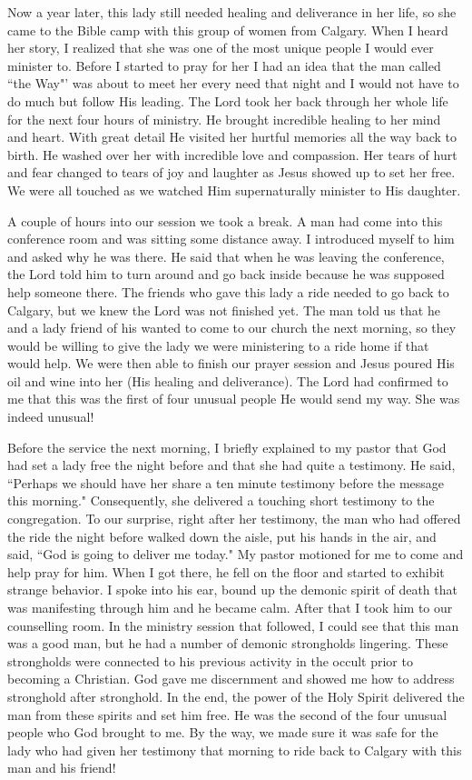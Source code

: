 \documentclass[oneside]{book}
\begin{document}
Now a year later, this lady still needed healing and deliverance in her life, so she came to the Bible camp with this group of women from Calgary. When I heard her story, I realized that she was one of the most unique people I would ever minister to. Before I started to pray for her I had an idea that the man called ``the Way"' was about to meet her every need that night and I would not have to do much but follow His leading. The Lord took her back through her whole life for the next four hours of ministry. He brought incredible healing to her mind and heart. With great detail He visited her hurtful memories all the way back to birth. He washed over her with incredible love and compassion. Her tears of hurt and fear changed to tears of joy and laughter as Jesus showed up to set her free. We were all touched as we watched Him supernaturally minister to His daughter.


A couple of hours into our session we took a break. A man had come into this conference room and was sitting some distance away. I introduced myself to him and asked why he was there. He said that when he was leaving the conference, the Lord told him to turn around and go back inside because he was supposed help someone there. The friends who gave this lady a ride needed to go back to Calgary, but we knew the Lord was not finished yet. The man told us that he and a lady friend of his wanted to come to our church the next morning, so they would be willing to give the lady we were ministering to a ride home if that would help. We were then able to finish our prayer session and Jesus poured His oil and wine into her (His healing and deliverance). The Lord had confirmed to me that this was the first of four unusual people He would send my way. She was indeed unusual!


Before the service the next morning, I briefly explained to my pastor that God had set a lady free the night before and that she had quite a testimony. He said, ``Perhaps we should have her share a ten minute testimony before the message this morning." Consequently, she delivered a touching short testimony to the congregation. To our surprise, right after her testimony, the man who had offered the ride the night before walked down the aisle, put his hands in the air, and said, ``God is going to deliver me today." My pastor motioned for me to come and help pray for him. When I got there, he fell on the floor and started to exhibit strange behavior. I spoke into his ear, bound up the demonic spirit of death that was manifesting through him and he became calm. After that I took him to our counselling room. In the ministry session that followed, I could see that this man was a good man, but he had a number of demonic strongholds lingering. These strongholds were connected to his previous activity in the occult prior to becoming a Christian. God gave me discernment and showed me how to address stronghold after stronghold. In the end, the power of the Holy Spirit delivered the man from these spirits and set him free. He was the second of the four unusual people who God brought to me. By the way, we made sure it was safe for the lady who had given her testimony that morning to ride back to Calgary with this man and his friend! 
\end{document}

